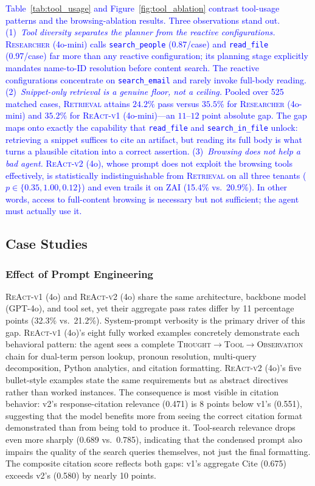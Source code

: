\textcolor{blue}{Table~\ref{tab:tool_usage} and Figure~\ref{fig:tool_ablation} contrast tool-usage patterns and the browsing-ablation results. Three observations stand out. (1)~\emph{Tool diversity separates the planner from the reactive configurations.} \textsc{Researcher} (4o-mini) calls \texttt{search\_people} (0.87/case) and \texttt{read\_file} (0.97/case) far more than any reactive configuration; its planning stage explicitly mandates name-to-ID resolution before content search. The reactive configurations concentrate on \texttt{search\_email} and rarely invoke full-body reading. (2)~\emph{Snippet-only retrieval is a genuine floor, not a ceiling.} Pooled over 525 matched cases, \textsc{Retrieval} attains $24.2\%$ pass versus $35.5\%$ for \textsc{Researcher} (4o-mini) and $35.2\%$ for \textsc{ReAct-v1} (4o-mini)---an $11$--$12$ point absolute gap. The gap maps onto exactly the capability that \texttt{read\_file} and \texttt{search\_in\_file} unlock: retrieving a snippet suffices to cite an artifact, but reading its full body is what turns a plausible citation into a correct assertion. (3)~\emph{Browsing does not help a bad agent.} \textsc{ReAct-v2} (4o), whose prompt does not exploit the browsing tools effectively, is statistically indistinguishable from \textsc{Retrieval} on all three tenants ($p\in\{0.35, 1.00, 0.12\}$) and even trails it on ZAI (15.4\% vs.\ 20.9\%). In other words, access to full-content browsing is necessary but not sufficient; the agent must actually use it.}

\subsection{Case Studies}
\label{sec:case-studies}

\subsubsection{Effect of Prompt Engineering}
\label{sec:prompt-analysis}
\textsc{ReAct-v1} (4o) and \textsc{ReAct-v2} (4o) share the same architecture, backbone model (GPT-4o), and tool set, yet their aggregate pass rates differ by 11 percentage points (32.3\% vs.\ 21.2\%). System-prompt verbosity is the primary driver of this gap. \textsc{ReAct-v1} (4o)'s eight fully worked examples concretely demonstrate each behavioral pattern: the agent sees a complete \textsc{Thought}$\to$\textsc{Tool}$\to$\textsc{Observation} chain for dual-term person lookup, pronoun resolution, multi-query decomposition, Python analytics, and citation formatting. \textsc{ReAct-v2} (4o)'s five bullet-style examples state the same requirements but as abstract directives rather than worked instances. The consequence is most visible in citation behavior: v2's response-citation relevance (0.471) is 8 points below v1's (0.551), suggesting that the model benefits more from seeing the correct citation format demonstrated than from being told to produce it. Tool-search relevance drops even more sharply (0.689 vs.\ 0.785), indicating that the condensed prompt also impairs the quality of the search queries themselves, not just the final formatting. The composite citation score reflects both gaps: v1's aggregate Cite (0.675) exceeds v2's (0.580) by nearly 10 points.

